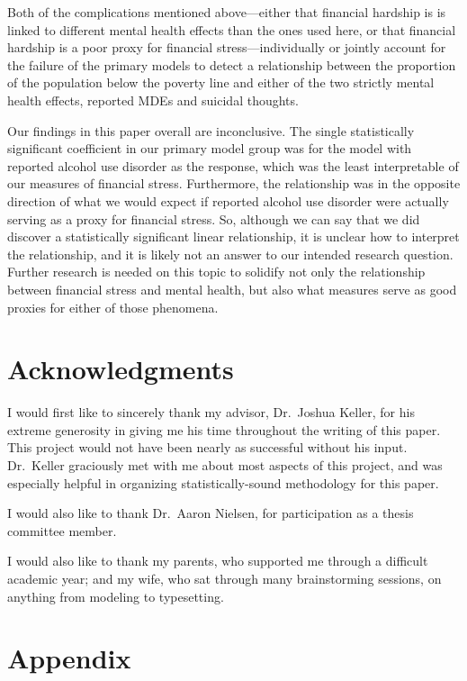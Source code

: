 \documentclass{article}
\begin{document}
Both of the complications mentioned above---either
that financial hardship is is linked to different mental
health effects than the ones used here,
or that financial hardship is a poor proxy for financial
stress---individually or jointly account for the
failure of the primary models to detect a relationship
between the proportion of the population below the poverty line
and either of the two strictly mental health effects,
reported MDEs and suicidal thoughts.

Our findings in this paper overall are inconclusive.
The single statistically significant coefficient
in our primary model group was
for the model with reported alcohol use disorder
as the response,
which was the least interpretable of our
measures of financial stress.
Furthermore, the relationship was in the opposite
direction of what we would expect
if reported alcohol use disorder were actually
serving as a proxy for financial stress.
So, although we can say that we did discover
a statistically significant linear relationship,
it is unclear how to interpret the relationship,
and it is likely not an answer to our intended
research question.
Further research is needed on this topic
to solidify not only the relationship between
financial stress and mental health,
but also what measures serve as good proxies
for either of those phenomena.

\section{Acknowledgments}

I would first like to sincerely thank my advisor,
Dr.\ Joshua Keller, for his extreme generosity in giving
me his time throughout the writing of this paper.
This project would not have been nearly as successful
without his input.
Dr.\ Keller graciously met with me about most
aspects of this project, and was especially
helpful in organizing statistically-sound
methodology for this paper.

I would also like to thank Dr.\ Aaron Nielsen,
for participation as a thesis committee member.

I would also like to thank my parents, who supported
me through a difficult academic year; and my wife,
who sat through many brainstorming sessions,
on anything from modeling to typesetting.

\pagebreak

\section{Appendix}
\end{document}
